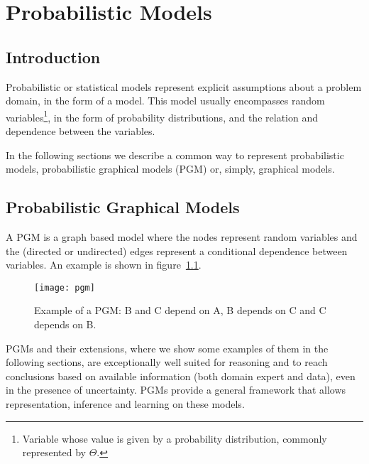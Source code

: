 \chapter{Probabilistic Models} \label{chap:models}

\section*{}

\section{Introduction}

Probabilistic or statistical models represent explicit assumptions about a 
problem domain, in the form of a model. This model usually encompasses random 
variables\footnote{Variable whose value is given by a probability distribution, 
commonly represented by $\Theta$.}, in the form of probability distributions, 
and the relation and dependence between the variables.~\cite{Winn2013}

In the following sections we describe a common way to represent probabilistic models, probabilistic graphical models (PGM) or, simply, graphical models.

\section{Probabilistic Graphical Models}

A PGM is a graph based model where the nodes represent random variables and the 
(directed or undirected) edges represent a conditional dependence between 
variables. An example is shown in figure~\ref{fig:pgm}.

\begin{figure}[h]
	\begin{center}
		\leavevmode
		\texttt{[image: pgm]}
		\caption{Example of a PGM: B and C depend on A, B depends on C and C 
		depends on B.}
		\label{fig:pgm}
	\end{center}
\end{figure}

PGMs and their extensions, where we show some examples of them in the following 
sections, are exceptionally well suited for reasoning and to reach conclusions 
based on available information (both domain expert and data), even in the 
presence of uncertainty. PGMs provide a general framework that allows 
representation, inference and learning on these 
models.~\cite{koller2009probabilistic}

